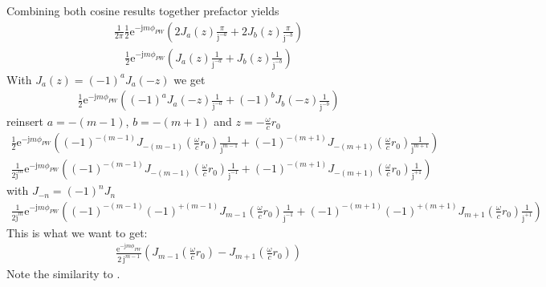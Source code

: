 \documentclass[a4paper,BCOR=15mm,10pt,twoside]{scrartcl}
\newcommand\e{\mathrm{e}}  %
\newcommand\im{\mathrm{j}}  %
\begin{document}
Combining both cosine results together prefactor yields
\begin{align}
\frac{1}{2\pi}
\frac{1}{2}
\e^{- \im m \phi_{PW}}
(2 J_{a}(z) \frac{\pi}{\im^{-a}} + 2 J_{b}(z) \frac{\pi}{\im^{-b}})
\end{align}
\begin{align}
\frac{1}{2}
\e^{- \im m \phi_{PW}}
(J_{a}(z) \frac{1}{\im^{-a}} + J_{b}(z) \frac{1}{\im^{-b}})
\end{align}
With $J_a(z) = (-1)^a J_a(-z)$ we get
\begin{align}
\frac{1}{2}
\e^{- \im m \phi_{PW}}
((-1)^a J_{a}(-z) \frac{1}{\im^{-a}} + (-1)^b J_{b}(-z) \frac{1}{\im^{-b}})
\end{align}
reinsert $a=-(m-1)$, $b=-(m+1)$ and $z=-\frac{\omega}{c} r_0 $ 
\begin{align}
\frac{1}{2}
\e^{- \im m \phi_{PW}}
((-1)^{-(m-1)} J_{-(m-1)}(\frac{\omega}{c} r_0) \frac{1}{\im^{m-1}} + (-1)^{-(m+1)} J_{-(m+1)}(\frac{\omega}{c} r_0) \frac{1}{\im^{m+1}})
\end{align}
\begin{align}
\frac{1}{2 \im^m}
\e^{- \im m \phi_{PW}}
((-1)^{-(m-1)} J_{-(m-1)}(\frac{\omega}{c} r_0) \frac{1}{\im^{-1}} + (-1)^{-(m+1)} J_{-(m+1)}(\frac{\omega}{c} r_0) \frac{1}{\im^{+1}})
\end{align}
with $J_{-n} = (-1)^n J_n$
\begin{align}
\frac{1}{2 \im^m}
\e^{- \im m \phi_{PW}}
((-1)^{-(m-1)} (-1)^{+(m-1)} J_{m-1}(\frac{\omega}{c} r_0) \frac{1}{\im^{-1}} + (-1)^{-(m+1)} (-1)^{+(m+1)} J_{m+1}(\frac{\omega}{c} r_0) \frac{1}{\im^{+1}})
\end{align}
This is what we want to get:
\begin{align}
\frac{\e^{- \im m \phi_{PW}}}{2\,\im^{m-1}}
(J_{m-1}(\frac{\omega}{c} r_0) - J_{m+1}(\frac{\omega}{c} r_0))
\end{align}
Note the similarity to \cite[Table 1]{Hahn2016AES}. 




\end{document}
